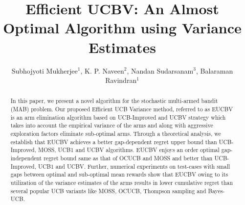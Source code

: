 \documentclass{llncs}
\begin{document}
%
\frontmatter          %
%
\pagestyle{headings}  %

\mainmatter              %
%
\title{Efficient UCBV: An Almost Optimal Algorithm using Variance Estimates}
%
%
\author{Subhojyoti Mukherjee${}^1$, K. P. Naveen${}^2$, Nandan
Sudarsanam${}^3$, Balaraman Ravindran${}^1$}
%
%
%

\maketitle              %

\begin{abstract}
In this paper, we present a novel algorithm for the stochastic multi-armed bandit (MAB) problem. Our proposed Efficient UCB Variance method, referred to as EUCBV is an arm elimination algorithm based on  UCB-Improved and UCBV strategy which takes into account the empirical variance of the arms and along  with aggressive exploration factors eliminate sub-optimal arms. Through a theoretical analysis, we establish that EUCBV achieves a better gap-dependent regret upper bound than UCB-Improved, MOSS, UCB1 and UCBV algorithms. EUCBV enjoys an order optimal gap-independent regret bound same as that of OCUCB and MOSS and better than UCB-Improved, UCB1 and UCBV. Further, numerical experiments on test-cases with small gaps between optimal and sub-optimal mean rewards show that EUCBV owing to its utilization of the variance estimates of the arms results in lower cumulative regret than several popular UCB variants like MOSS, OCUCB, Thompson sampling and Bayes-UCB. 

\end{abstract}
\end{document}
